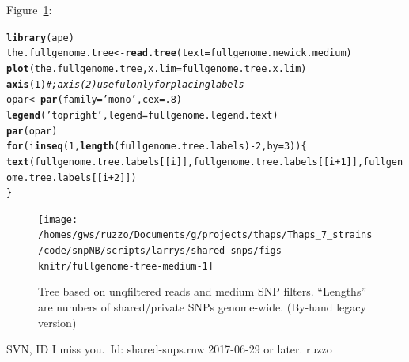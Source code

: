 \documentclass{article}\usepackage[]{graphicx}\usepackage[]{color}
\makeatletter
\newcommand{\hlnum}[1]{\textcolor[rgb]{0.686,0.059,0.569}{#1}}%
\newcommand{\hlstr}[1]{\textcolor[rgb]{0.192,0.494,0.8}{#1}}%
\newcommand{\hlcom}[1]{\textcolor[rgb]{0.678,0.584,0.686}{\textit{#1}}}%
\newcommand{\hlopt}[1]{\textcolor[rgb]{0,0,0}{#1}}%
\newcommand{\hlstd}[1]{\textcolor[rgb]{0.345,0.345,0.345}{#1}}%
\newcommand{\hlkwa}[1]{\textcolor[rgb]{0.161,0.373,0.58}{\textbf{#1}}}%
\newcommand{\hlkwb}[1]{\textcolor[rgb]{0.69,0.353,0.396}{#1}}%
\newcommand{\hlkwc}[1]{\textcolor[rgb]{0.333,0.667,0.333}{#1}}%
\newcommand{\hlkwd}[1]{\textcolor[rgb]{0.737,0.353,0.396}{\textbf{#1}}}%
\newenvironment{kframe}{%
 \def\at@end@of@kframe{}%
 \ifinner\ifhmode%
  \def\at@end@of@kframe{\end{minipage}}%
  \begin{minipage}{\columnwidth}%
 \fi\fi%
 \def\FrameCommand##1{\hskip\@totalleftmargin \hskip-\fboxsep
 \colorbox{shadecolor}{##1}\hskip-\fboxsep
     \hskip-\linewidth \hskip-\@totalleftmargin \hskip\columnwidth}%
 \MakeFramed {\advance\hsize-\width
   \@totalleftmargin\z@ \linewidth\hsize
   \@setminipage}}%
 {\par\unskip\endMakeFramed%
 \at@end@of@kframe}
\newenvironment{knitrout}{}{} %
\makeatother
\begin{document}
Figure~\ref{fig:fullgenome-tree-medium}:

\begin{knitrout}\scriptsize
{}\color{fgcolor}\begin{kframe}
\begin{alltt}
\hlkwd{library}\hlstd{(ape)}
\hlstd{the.fullgenome.tree} \hlkwb{<-} \hlkwd{read.tree}\hlstd{(}\hlkwc{text}\hlstd{=fullgenome.newick.medium)}
\hlkwd{plot}\hlstd{(the.fullgenome.tree,} \hlkwc{x.lim} \hlstd{= fullgenome.tree.x.lim)}
\hlkwd{axis}\hlstd{(}\hlnum{1}\hlstd{)} \hlcom{# ; axis(2) useful only for placing labels}
\hlstd{opar} \hlkwb{<-} \hlkwd{par}\hlstd{(}\hlkwc{family}\hlstd{=}\hlstr{'mono'}\hlstd{,}\hlkwc{cex}\hlstd{=}\hlnum{.8}\hlstd{)}
\hlkwd{legend}\hlstd{(}\hlstr{'topright'}\hlstd{,} \hlkwc{legend}\hlstd{=fullgenome.legend.text)}
\hlkwd{par}\hlstd{(opar)}
\hlkwa{for}\hlstd{(i} \hlkwa{in} \hlkwd{seq}\hlstd{(}\hlnum{1}\hlstd{,}\hlkwd{length}\hlstd{(fullgenome.tree.labels)}\hlopt{-}\hlnum{2}\hlstd{,}\hlkwc{by}\hlstd{=}\hlnum{3}\hlstd{))\{}
  \hlkwd{text}\hlstd{(fullgenome.tree.labels[[i]], fullgenome.tree.labels[[i}\hlopt{+}\hlnum{1}\hlstd{]], fullgenome.tree.labels[[i}\hlopt{+}\hlnum{2}\hlstd{]])}
\hlstd{\}}
\end{alltt}
\end{kframe}\begin{figure}

{\centering \texttt{[image: /homes/gws/ruzzo/Documents/g/projects/thaps/Thaps\_7\_strains/code/snpNB/scripts/larrys/shared-snps/figs-knitr/fullgenome-tree-medium-1]} 

}

\caption[Tree based on unqfiltered reads and medium SNP filters]{Tree based on unqfiltered reads and medium SNP filters.  ``Lengths'' are numbers of shared/private SNPs genome-wide. (By-hand legacy version)}\label{fig:fullgenome-tree-medium}
\end{figure}


\end{knitrout}

\FloatBarrier

\mbox{}\vfill\footnotesize\flushright SVN, ID I miss you.\ $ $Id: shared-snps.rnw  2017-06-29 or later. ruzzo $ $
\end{document}
